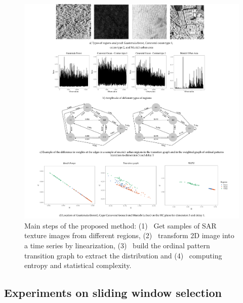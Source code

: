 \documentclass[journal]{IEEEtran}
\begin{document}
	
	\begin{figure}[hbt]
		\includegraphics[width=2\columnwidth]{Figures/example.pdf}
		\caption{Main steps of the proposed method: 
			(1)~ Get samples of SAR texture images from different regions,
			(2)~ transform 2D image into a time series by linearization,
			(3)~ build the ordinal pattern transition graph to extract the distribution and
			(4)~ computing entropy and statistical complexity.}
		\label{fig:example}
	\end{figure}
	
	\subsection{Experiments on sliding window selection}
	
\end{document}
